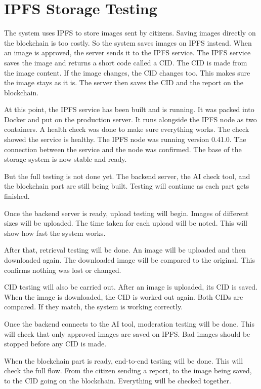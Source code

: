 \section{IPFS Storage Testing}


The system uses IPFS to store images sent by citizens. Saving images directly on the blockchain is too costly. So the system saves images on IPFS instead. When an image is approved, the server sends it to the IPFS service. The IPFS service saves the image and returns a short code called a CID. The CID is made from the image content. If the image changes, the CID changes too. This makes sure the image stays as it is. The server then saves the CID and the report on the blockchain.

At this point, the IPFS service has been built and is running. It was packed into Docker and put on the production server. It runs alongside the IPFS node as two containers. A health check was done to make sure everything works. The check showed the service is healthy. The IPFS node was running version 0.41.0. The connection between the service and the node was confirmed. The base of the storage system is now stable and ready.

But the full testing is not done yet. The backend server, the AI check tool, and the blockchain part are still being built. Testing will continue as each part gets finished.

Once the backend server is ready, upload testing will begin. Images of different sizes will be uploaded. The time taken for each upload will be noted. This will show how fast the system works.

After that, retrieval testing will be done. An image will be uploaded and then downloaded again. The downloaded image will be compared to the original. This confirms nothing was lost or changed.

CID testing will also be carried out. After an image is uploaded, its CID is saved. When the image is downloaded, the CID is worked out again. Both CIDs are compared. If they match, the system is working correctly.

Once the backend connects to the AI tool, moderation testing will be done. This will check that only approved images are saved on IPFS. Bad images should be stopped before any CID is made.

When the blockchain part is ready, end-to-end testing will be done. This will check the full flow. From the citizen sending a report, to the image being saved, to the CID going on the blockchain. Everything will be checked together.

